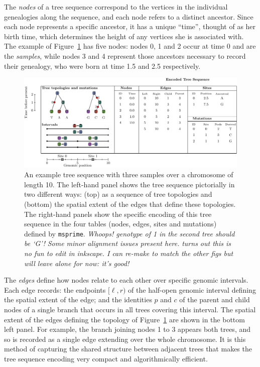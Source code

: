 \documentclass{article}
\newcommand{\msprime}{\texttt{msprime}}
\newcommand{\plr}[1]{{\em \color{blue} #1}}
\newcommand{\jk}[1]{{\em \color{red} #1}}
\begin{document}
The \emph{nodes} of a tree sequence 
correspond to the vertices in the individual genealogies along the sequence,
and each node refers to a distinct ancestor.
Since each node represents a specific ancestor, it has a unique ``time'',
thought of as her birth time, which determines the height of any vertices
she is associated with. 
The example of Figure~\ref{fig:example_tree_sequence} has five nodes:
nodes 0, 1 and 2 occur at time 0 and are the \emph{samples},
while nodes 3 and 4 represent those ancestors necessary to record their genealogy,
who were born at time 1.5 and 2.5 respectively.

\begin{figure}
    \begin{center}
        \includegraphics[width=\textwidth]{example_tree_sequence}
    \end{center}
    \caption{
        An example tree sequence with three samples over a chromosome of length 10.
        The left-hand panel shows the tree sequence pictorially in two different ways:
        (top) as a sequence of tree topologies 
        and (bottom) the spatial extent of the edges that define these topologies. 
        The right-hand panels show the specific encoding
        of this tree sequence in the four tables (nodes, edges, sites and mutations) 
        defined by \msprime.
        \plr{Whoops!  genotype of 1 in the second tree should be `G'!}
        \jk{Some minor alignment issues present here.}
        \plr{turns out this is no fun to edit in inkscape.  
            I can re-make to match the other figs
            but will leave alone for now: it's good!}
        \label{fig:example_tree_sequence}
    }
\end{figure}

The \emph{edges} define how nodes relate to each other over specific genomic intervals. 
Each edge records: 
the endpoints $[\ell, r)$ of the half-open genomic interval defining the
spatial extent of the edge; 
and the identities $p$ and $c$ of the parent and child nodes
of a single branch that occurs in all trees covering this interval.
The spatial extent of the edges defining the topology of Figure~\ref{fig:example_tree_sequence}
are shown in the bottom left panel. 
For example, the branch joining nodes 1 to 3 appears both trees,
and so is recorded as a single edge extending over the whole chromosome. 
It is this method of capturing the shared structure between adjacent trees that makes the
tree sequence encoding very compact and algorithmically efficient.
\end{document}
